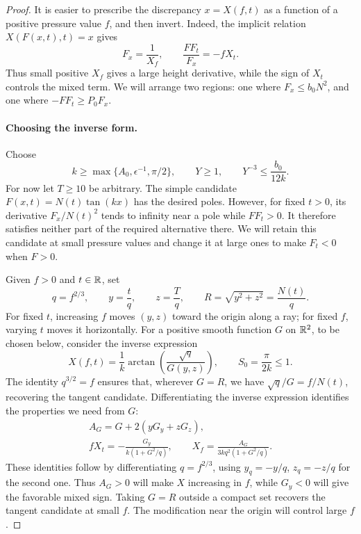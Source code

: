 \begin{proof}
It is easier to prescribe the discrepancy \(x=X(f,t)\) as a function
of a positive pressure value \(f\), and then invert.  Indeed, the implicit
relation \(X(F(x,t),t)=x\) gives
\[
 F_x=\frac1{X_f},\qquad
 \frac{FF_t}{F_x}=-fX_t.
\]
Thus small positive \(X_f\) gives a large height derivative, while the sign
of \(X_t\) controls the mixed term.  We will arrange two regions: one where
\(F_x\le b_0N^2\), and one where \(-FF_t\ge P_0F_x\).

\paragraph{Choosing the inverse form.}
Choose
\[
 k\ge\max\{A_0,\epsilon^{-1},\pi/2\},\qquad
 Y\ge1,\qquad Y^{-3}\le\frac{b_0}{12k}.
\]
For now let \(T\ge10\) be arbitrary.  The simple candidate
\(F(x,t)=N(t)\tan(kx)\) has the desired poles.
However, for fixed \(t>0\), its derivative \(F_x/N(t)^2\) tends to
infinity near a pole while \(FF_t>0\).  It therefore satisfies neither
part of the required alternative there.  We will retain this candidate
at small pressure values and change it at large ones to make \(F_t<0\)
when \(F>0\).

Given \(f>0\) and \(t\in\mathbb R\), set
\[
 q=f^{2/3},\qquad y=\frac tq,\qquad z=\frac Tq,
       \qquad R=\sqrt{y^2+z^2}=\frac{N(t)}q.
\]
For fixed \(t\), increasing \(f\) moves \((y,z)\) toward the origin
along a ray; for fixed \(f\), varying \(t\) moves it horizontally.
For a positive smooth function \(G\) on \(\mathbb R^2\), to be chosen below,
consider the inverse expression
\begin{equation}\label{pressure:inverse}
 X(f,t)=\frac1k\arctan\!\left(\frac{\sqrt q}{G(y,z)}\right),
       \qquad S_0=\frac\pi{2k}\le1.
\end{equation}
The identity \(q^{3/2}=f\) ensures that, wherever \(G=R\), we have
\(\sqrt q/G=f/N(t)\), recovering the tangent candidate.
Differentiating the inverse expression identifies the properties we need
from \(G\):
\begin{equation}\label{pressure:inverse-derivatives}
 \begin{gathered}
 A_G=G+2(yG_y+zG_z),\\
 fX_t=-\frac{G_y}{k(1+G^2/q)},\qquad
 X_f=\frac{A_G}{3kq^2(1+G^2/q)}.
 \end{gathered}
\end{equation}
These identities follow by differentiating \(q=f^{2/3}\), using
\(y_q=-y/q\), \(z_q=-z/q\) for the second one.  Thus \(A_G>0\)
will make \(X\) increasing in \(f\), while \(G_y<0\) will give the
favorable mixed sign.  Taking \(G=R\) outside a compact set recovers the
tangent candidate at small \(f\).  The modification near the origin
will control large \(f\).


\end{proof}
